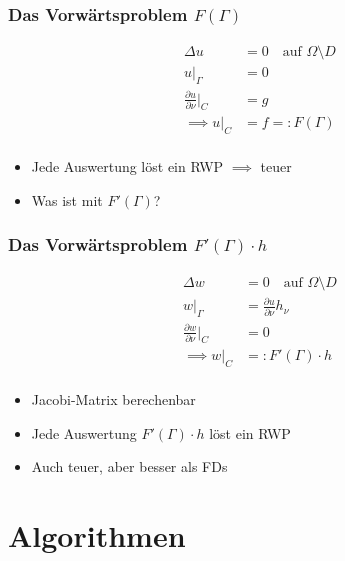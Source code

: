 \documentclass{beamer}
\begin{document}
\begin{frame}
	\frametitle{Das Vorwärtsproblem $F(\Gamma)$}
	\begin{minipage}{0.5\textwidth}
		\begin{align*}
			\Delta u &= 0 \quad \text{auf $\Omega \setminus D$} \\
			u|_\Gamma &= 0 \\
			\tfrac{\partial u}{\partial \nu}|_C &= g \\
			\implies u|_C &= f =: F(\Gamma) \\
		\end{align*}
	\end{minipage}
	\begin{minipage}{0.48\textwidth}
		\begin{itemize}
			\item \pause
				Jede Auswertung löst ein RWP $\implies$ teuer
			\item \pause
				Was ist mit $F'(\Gamma)$?
		\end{itemize}
	\end{minipage}
\end{frame}

\begin{frame}
	\frametitle{Das Vorwärtsproblem $F'(\Gamma) \cdot h$}
	\begin{minipage}{0.5\textwidth}
		\begin{align*}
			\Delta w &= 0 \quad \text{auf $\Omega \setminus D$} \\
			w|_\Gamma &= \tfrac{\partial u}{\partial \nu} h_\nu \\
			\tfrac{\partial w}{\partial \nu}|_C &= 0 \\
			\implies w|_C &=: F'(\Gamma) \cdot h \\
		\end{align*}
	\end{minipage}
	\begin{minipage}{0.48\textwidth}
		\begin{itemize}
			\item \pause
				Jacobi-Matrix berechenbar
			\item \pause
				Jede Auswertung $F'(\Gamma)\cdot h$ löst ein RWP
			\item
				Auch teuer, aber besser als FDs
		\end{itemize}
	\end{minipage}
\end{frame}

\section{Algorithmen}
\end{document}

